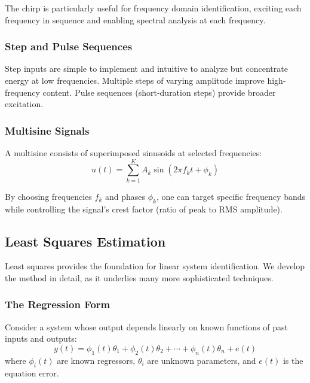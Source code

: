 The chirp is particularly useful for frequency domain identification, exciting each frequency in sequence and enabling spectral analysis at each frequency.

\subsubsection{Step and Pulse Sequences}

Step inputs are simple to implement and intuitive to analyze but concentrate energy at low frequencies. Multiple steps of varying amplitude improve high-frequency content. Pulse sequences (short-duration steps) provide broader excitation.

\subsubsection{Multisine Signals}

A multisine consists of superimposed sinusoids at selected frequencies:
\begin{equation}
u(t) = \sum_{k=1}^{K} A_k \sin(2\pi f_k t + \phi_k)
\end{equation}

By choosing frequencies $f_k$ and phases $\phi_k$, one can target specific frequency bands while controlling the signal's crest factor (ratio of peak to RMS amplitude).

\subsection{Least Squares Estimation}
\label{subsec:least_squares}

Least squares provides the foundation for linear system identification. We develop the method in detail, as it underlies many more sophisticated techniques.

\subsubsection{The Regression Form}

Consider a system whose output depends linearly on known functions of past inputs and outputs:
\begin{equation}
y(t) = \phi_1(t) \theta_1 + \phi_2(t) \theta_2 + \cdots + \phi_n(t) \theta_n + e(t)
\label{eq:regression_scalar}
\end{equation}
where $\phi_i(t)$ are known regressors, $\theta_i$ are unknown parameters, and $e(t)$ is the equation error.

